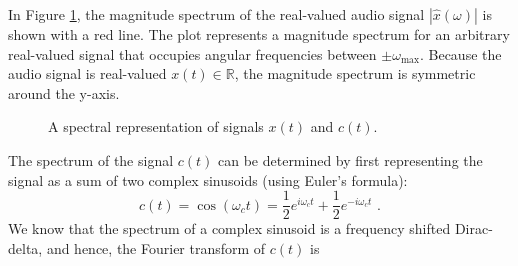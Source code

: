In Figure \ref{fig:am_spectra0}, the magnitude spectrum of the real-valued audio
signal $|\hat{x}(\omega)|$ is shown with a red line. The plot
represents a magnitude spectrum for an arbitrary real-valued signal
that occupies angular frequencies between
$\pm \omega_{\mathrm{max}}$. Because the audio signal is real-valued
$x(t)\in \mathbb{R}$, the magnitude spectrum is symmetric around the
y-axis.
\begin{figure}
\begin{center}
\end{center}
\caption{A spectral representation of signals $x(t)$ and $c(t)$.}
\label{fig:am_spectra0}
\end{figure}
The spectrum of the signal $c(t)$ can be determined by first representing the 
signal as a sum of two complex sinusoids (using Euler's formula):
\begin{equation}
c(t) = \cos(\omega_c t) = \frac{1}{2}e^{i\omega_c t} + \frac{1}{2} e^{-i\omega_c t}\,\,.
\end{equation}
We know that the spectrum of a complex sinusoid is a frequency shifted
Dirac-delta, and hence, the Fourier transform of $c(t)$ is
